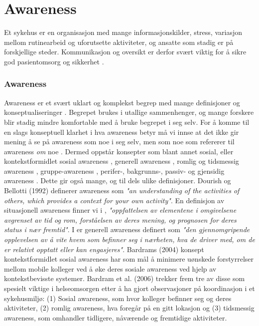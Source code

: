 \section{Awareness}
\label{chp: awareness}

Et sykehus er en organisasjon med mange informasjonskilder, stress, variasjon mellom rutinearbeid og uforutsette aktiviteter, og ansatte som stadig er på forskjellige steder. Kommunikasjon og oversikt er derfor svært viktig for å sikre god pasientomsorg og sikkerhet \cite{Klemets12}.

\subsubsection{Awareness}
Awareness er et svært uklart og komplekst begrep med mange definisjoner og konseptualiseringer \cite{KlemetsRedundancy, Gutwin04, Schmidt02}. Begrepet brukes i utallige sammenhenger, og mange forskere blir stadig mindre komfortable med å bruke begrepet i seg selv. For å komme til en slags konseptuell klarhet i hva awareness betyr må vi innse at det ikke gir mening å se på awareness som noe i seg selv, men som noe som refererer til awareness \emph{om} noe \cite{Schmidt02}. Dermed oppstår konsepter som blant annet sosial, eller kontekstformidlet sosial awareness \cite{Bardram04}, generell awareness \cite{Gross13}, romlig og tidsmessig awareness \cite{Randell}, gruppe-awareness \cite{Gutwin04}, perifer-, bakgrunns-, passiv- og gjensidig awareness \cite{Schmidt02}. Dette gir også mange, og til dels ulike definisjoner. Dourish og Bellotti (1992)\nocite{Dourish92} definerer awareness som \emph{"an understanding of the activities of others, which provides a context for your own activity"}. En definisjon av situasjonell awareness finner vi i \cite{Endsly95}, \emph{"oppfattelsen av elementene i omgivelsene avgrenset av tid og rom, forståelsen av deres mening, og prognosen for deres status i nær fremtid"}. I \cite{Gross13} er generell awareness definert som \emph{"den gjennomgripende opplevelsen av å vite hvem som befinner seg i nærheten, hva de driver med, om de er relativt opptatt eller kan engasjeres"}. Bardrams (2004) konsept kontekstformidlet sosial awareness har som mål å minimere uønskede forstyrrelser mellom mobile kolleger ved å øke deres sosiale awareness ved hjelp av kontekstbevisste systemer. Bardram et al. (2006) trekker frem tre av disse som spesielt viktige i helseomsorgen etter å ha gjort observasjoner på koordinasjon i et sykehusmiljø: (1) Sosial awareness, som hvor kolleger befinner seg og deres aktiviteter, (2) romlig awareness, hva foregår på en gitt lokasjon og (3) tidsmessig awareness, som omhandler tidligere, nåværende og fremtidige aktiviteter.

